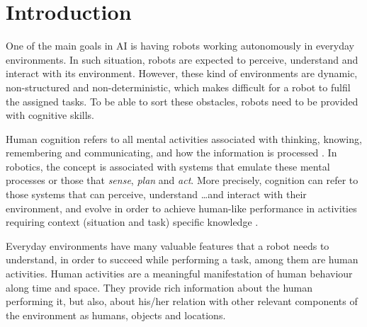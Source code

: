 \chapter{Introduction}

One of the main goals in AI is having robots working autonomously in everyday environments. 
In such situation, robots are expected to perceive, understand and interact with its environment. 
However, these kind of environments are dynamic, non-structured and non-deterministic, which makes difficult for a robot to fulfil the assigned tasks. 
To be able to sort these obstacles, robots need to be provided with cognitive skills.

Human cognition refers to all mental activities associated with thinking, knowing, remembering and communicating, and how the information is processed \citep{King2014Psychology,myers2013psychology}. 
In robotics, the concept is associated with systems that emulate these mental processes or those that \textit{sense}, \textit{plan} and \textit{act}.
More precisely, cognition can refer to those systems that can perceive, understand \ldots and interact with their environment, and evolve in order to achieve human-like performance in activities requiring context (situation and task) specific knowledge \citep{christensen2010cognitive}.

Everyday environments have many valuable features that a robot needs to understand, in order to succeed while performing a task, among them are human activities.
Human activities are a meaningful manifestation of human behaviour along time and space. %
They provide rich information about the human performing it, but also, about his/her relation with other relevant components of the environment as humans, objects and locations.


